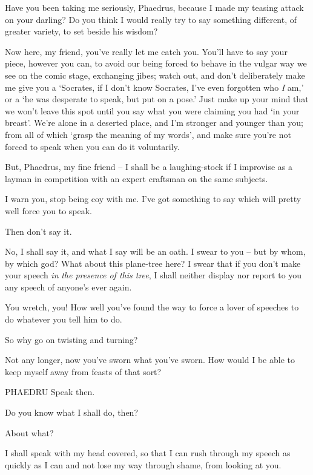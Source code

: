 Have you been taking me seriously, Phaedrus,  because I
made my teasing attack on your darling? Do you think I would really try
to say something different, of greater variety, to set beside his
wisdom?

Now here, my friend, you've really let me catch  you.
You'll have to say your piece, however you can, to avoid our being
forced to behave in the vulgar way we see on the comic stage, exchanging
jibes; watch out, and don't deliberately  make me give you a
‘Socrates, if I don't know Socrates, I've even forgotten who {\em I}
am,' or a ‘he was desperate to speak, but put on a pose.' Just make up
your mind that we won't leave this spot until you say what you were
claiming you had ‘in your  breast'. We're alone in a deserted
place, and I'm stronger and younger than you; from all of which ‘grasp
the meaning of my words',
and make sure you're not forced to speak when you can do it voluntarily.

But, Phaedrus, my fine friend -- I shall be a laughing-stock
 if I improvise as a layman in competition with an expert
craftsman on the same
subjects.

I warn you, stop being coy with me. I've got something to say
which will pretty well force you to speak.

Then don't say it.

 No, I shall say it, and what I say will be an oath. I
 swear to you -- but by whom, by which god? What about this
plane-tree here? I swear that if you don't make your speech {\em in}
{\em the presence of this tree}, I shall neither display nor report to
you any speech of anyone's ever again.

You wretch, you! How well you've found the way to force
a lover of speeches to do whatever you tell him to do.

So why go on twisting and turning?

Not any longer, now you've sworn what you've sworn. How would I
be able to keep myself away from feasts of that sort?

 PHAEDRU Speak then.

Do you know what I shall do, then?

About what?

I shall speak with my head covered, so that I can  rush
through my speech as quickly as I can and not lose my way through shame,
from looking at you.

